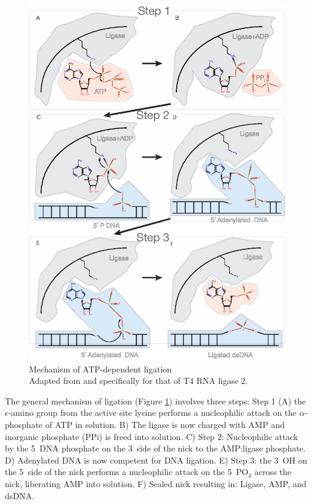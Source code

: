     \begin{figure}%
      \centering 
      \includegraphics{Figures/Intro/LigationMechanism.eps}
      \caption[Mechanism of Rnl2 ATP-dependent ligation]
      {
        Mechanism of ATP-dependent ligation\\[0.25cm]
        Adapted from \citep{Nandakumar2006} and specifically for that of T4 RNA ligase 2.
        }
      \label{Intro:fig:Ligation Mechanism}
      \end{figure}

    The general mechanism of ligation (Figure \ref{Intro:fig:Ligation Mechanism}) involves three steps: Step 1 (A) the $\epsilon$-amino group from the active site lysine performs a nucleophilic attack on the $\alpha$-phosphate of ATP in solution. B) The ligase is now charged with AMP and inorganic phosphate (PPi) is freed into solution. C) Step 2: Nucleophilic attack by the 5\textprime~DNA phosphate on the 3\textprime~side of the nick to the AMP:ligase phosphate. D) Adenylated DNA is now competent for DNA ligation. E) Step 3: the 3\textprime~OH on the 5\textprime~side of the nick performs a nucleophilic attack on the 5\textprime~PO$_{4}$ across the nick, liberating AMP into solution. F) Sealed nick resulting in: Ligase, AMP, and dsDNA.

